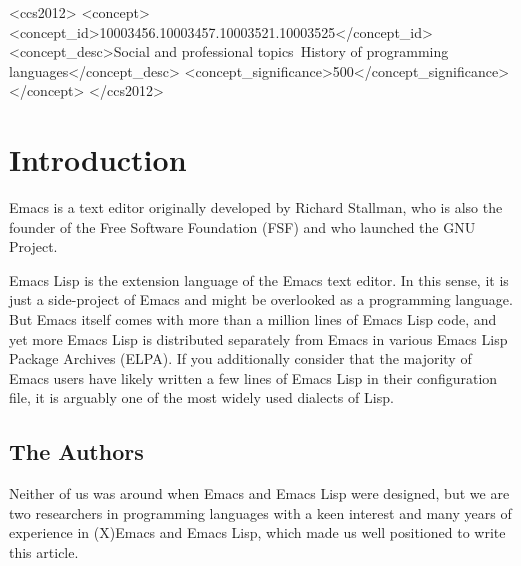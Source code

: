 \documentclass[format=acmsmall,screen]{acmart}
\newcommand \Elisp {Emacs Lisp}
\begin{document}
\begin{CCSXML}
<ccs2012>
<concept>
<concept_id>10003456.10003457.10003521.10003525</concept_id>
<concept_desc>Social and professional topics~History of programming languages</concept_desc>
<concept_significance>500</concept_significance>
</concept>
</ccs2012>
\end{CCSXML}






\maketitle

\clearpage
\tableofcontents

\section{Introduction}

Emacs is a text editor originally developed by Richard Stallman, who is also
the founder of the Free Software Foundation (FSF) and who launched the GNU
Project.

\Elisp{} is the extension language of the Emacs text editor.
In this sense, it is just a side-project of Emacs and might be overlooked as
a programming language.  But Emacs itself comes with more than a million
lines of \Elisp{} code, and yet more \Elisp{} is distributed separately from
Emacs in various Emacs Lisp Package Archives (ELPA).  If you additionally
consider that the majority of Emacs users have likely written a few lines of
\Elisp{} in their configuration file, it is arguably one of the most widely
used dialects of Lisp.


\subsection{The Authors}

Neither of us was around when Emacs and \Elisp{} were designed, but we are
two researchers in programming languages with a keen interest and many
years of
experience in (X)Emacs and \Elisp{}, which made us well positioned to write
this article.
\end{document}
